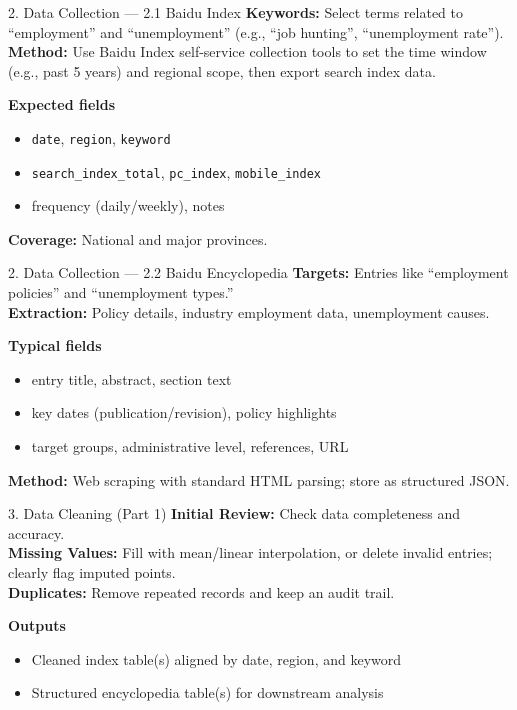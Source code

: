 \documentclass[aspectratio=169,11pt]{beamer}
\begin{document}
	\begin{frame}{2. Data Collection — 2.1 Baidu Index}
		\small
		\textbf{Keywords:} Select terms related to “employment” and “unemployment” (e.g., “job hunting”, “unemployment rate”). \\
		\textbf{Method:} Use Baidu Index self-service collection tools to set the time window (e.g., past 5 years) and regional scope, then export search index data.
		\medskip
		
		\textbf{Expected fields}
		\begin{itemize}
			\item \texttt{date}, \texttt{region}, \texttt{keyword}
			\item \texttt{search\_index\_total}, \texttt{pc\_index}, \texttt{mobile\_index}
			\item frequency (daily/weekly), notes
		\end{itemize}
		\textbf{Coverage:} National and major provinces.
	\end{frame}
	
	\begin{frame}{2. Data Collection — 2.2 Baidu Encyclopedia}
		\small
		\textbf{Targets:} Entries like “employment policies” and “unemployment types.” \\
		\textbf{Extraction:} Policy details, industry employment data, unemployment causes.
		\medskip
		
		\textbf{Typical fields}
		\begin{itemize}
			\item entry title, abstract, section text
			\item key dates (publication/revision), policy highlights
			\item target groups, administrative level, references, URL
		\end{itemize}
		\textbf{Method:} Web scraping with standard HTML parsing; store as structured JSON.
	\end{frame}
	
	\begin{frame}{3. Data Cleaning (Part 1)}
		\small
		\textbf{Initial Review:} Check data completeness and accuracy. \\
		\textbf{Missing Values:} Fill with mean/linear interpolation, or delete invalid entries; clearly flag imputed points. \\
		\textbf{Duplicates:} Remove repeated records and keep an audit trail.
		\medskip
		
		\textbf{Outputs}
		\begin{itemize}
			\item Cleaned index table(s) aligned by date, region, and keyword
			\item Structured encyclopedia table(s) for downstream analysis
		\end{itemize}
	\end{frame}
	
\end{document}
